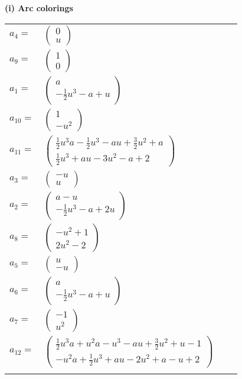 \documentclass[1p]{elsarticle_modified}
\theoremstyle{definition}
\begin{document}
\flushleft \textbf{(i) Arc colorings}\\
\begin{tabular}{m{7pt} m{180pt} m{7pt} m{180pt} }
\flushright $a_{4}=$&$\begin{pmatrix}0\\u\end{pmatrix}$ \\
\flushright $a_{9}=$&$\begin{pmatrix}1\\0\end{pmatrix}$ \\
\flushright $a_{1}=$&$\begin{pmatrix}a\\-\frac{1}{2} u^3- a+u\end{pmatrix}$ \\
\flushright $a_{10}=$&$\begin{pmatrix}1\\- u^2\end{pmatrix}$ \\
\flushright $a_{11}=$&$\begin{pmatrix}\frac{1}{2} u^3 a-\frac{1}{2} u^3- a u+\frac{3}{2} u^2+a\\\frac{1}{2} u^3+a u-3 u^2- a+2\end{pmatrix}$ \\
\flushright $a_{3}=$&$\begin{pmatrix}- u\\u\end{pmatrix}$ \\
\flushright $a_{2}=$&$\begin{pmatrix}a- u\\-\frac{1}{2} u^3- a+2 u\end{pmatrix}$ \\
\flushright $a_{8}=$&$\begin{pmatrix}- u^2+1\\2 u^2-2\end{pmatrix}$ \\
\flushright $a_{5}=$&$\begin{pmatrix}u\\- u\end{pmatrix}$ \\
\flushright $a_{6}=$&$\begin{pmatrix}a\\-\frac{1}{2} u^3- a+u\end{pmatrix}$ \\
\flushright $a_{7}=$&$\begin{pmatrix}-1\\u^2\end{pmatrix}$ \\
\flushright $a_{12}=$&$\begin{pmatrix}\frac{1}{2} u^3 a+u^2 a- u^3- a u+\frac{3}{2} u^2+u-1\\- u^2 a+\frac{1}{2} u^3+a u-2 u^2+a- u+2\end{pmatrix}$\\&\end{tabular}
\end{document}
